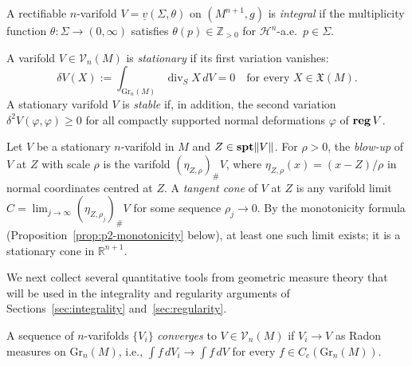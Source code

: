 \begin{definition}\label{def:integral-varifold}
A rectifiable $n$-varifold $V = \underline{v}(\Sigma, \theta)$ on $(M^{n+1}, g)$ is \emph{integral} if the multiplicity function $\theta \colon \Sigma \to (0, \infty)$ satisfies $\theta(p) \in \mathbb{Z}_{>0}$ for $\mathcal{H}^n$-a.e.\ $p \in \Sigma$.
\end{definition}

\begin{definition}\label{def:p2-stationary}
A varifold $V \in \mathcal{V}_n(M)$ is \emph{stationary} if its first variation vanishes:
\[
\delta V(X) := \int_{\mathrm{Gr}_n(M)} \operatorname{div}_S X \, dV = 0 \quad \text{for every } X \in \mathfrak{X}(M).
\]
A stationary varifold $V$ is \emph{stable} if, in addition, the second variation $\delta^2 V(\varphi, \varphi) \geq 0$ for all compactly supported normal deformations $\varphi$ of $\mathbf{reg}\, V$.
\end{definition}

\begin{definition}\label{def:p2-tangent-cone}
Let $V$ be a stationary $n$-varifold in $M$ and $Z \in \mathbf{spt}\|V\|$. For $\rho > 0$, the \emph{blow-up} of $V$ at $Z$ with scale $\rho$ is the varifold $(\eta_{Z,\rho})_\# V$, where $\eta_{Z,\rho}(x) = (x - Z)/\rho$ in normal coordinates centred at $Z$. A \emph{tangent cone} of $V$ at $Z$ is any varifold limit $C = \lim_{j \to \infty} (\eta_{Z,\rho_j})_\# V$ for some sequence $\rho_j \to 0$. By the monotonicity formula (Proposition~\ref{prop:p2-monotonicity} below), at least one such limit exists; it is a stationary cone in $\mathbb{R}^{n+1}$.
\end{definition}

We next collect several quantitative tools from geometric measure theory that will be used in the integrality and regularity arguments of Sections~\ref{sec:integrality} and~\ref{sec:regularity}.

\begin{definition}\label{def:p2-varifold-convergence}
A sequence of $n$-varifolds $\{V_i\}$ \emph{converges} to $V \in \mathcal{V}_n(M)$ if $V_i \to V$ as Radon measures on $\mathrm{Gr}_n(M)$, i.e., $\int f \, dV_i \to \int f \, dV$ for every $f \in C_c(\mathrm{Gr}_n(M))$.
\end{definition}

